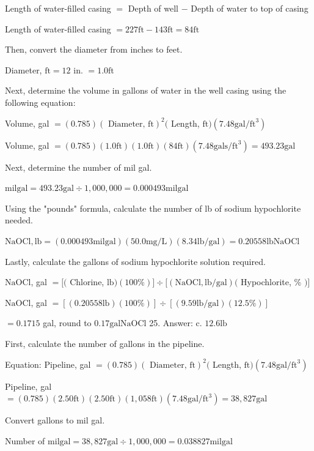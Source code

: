 \documentclass[10pt]{article}
\begin{document}
Length of water-filled casing $=$ Depth of well $-$ Depth of water to top of casing

Length of water-filled casing $=227 \mathrm{ft}-143 \mathrm{ft}=84 \mathrm{ft}$

Then, convert the diameter from inches to feet.

Diameter, $\mathrm{ft}=12$ in. $=1.0 \mathrm{ft}$

Next, determine the volume in gallons of water in the well casing using the following equation:

Volume, gal $=(0.785)(\text { Diameter, } \mathrm{ft})^{2}($ Length, $\mathrm{ft})\left(7.48 \mathrm{gal} / \mathrm{ft}^{3}\right)$

Volume, gal $=(0.785)(1.0 \mathrm{ft})(1.0 \mathrm{ft})(84 \mathrm{ft})\left(7.48 \mathrm{gals} / \mathrm{ft}^{3}\right)=493.23 \mathrm{gal}$

Next, determine the number of mil gal.

$\mathrm{mil} \mathrm{gal}=493.23 \mathrm{gal} \div 1,000,000=0.000493 \mathrm{mil} \mathrm{gal}$

Using the "pounds" formula, calculate the number of lb of sodium hypochlorite needed.

$\mathrm{NaOCl}, \mathrm{lb}=(0.000493 \mathrm{mil} \mathrm{gal})(50.0 \mathrm{mg} / \mathrm{L})(8.34 \mathrm{lb} / \mathrm{gal})=0.20558 \mathrm{lb} \mathrm{NaOCl}$

Lastly, calculate the gallons of sodium hypochlorite solution required.

$\mathrm{NaOCl}$, gal $=[($ Chlorine, $\mathrm{lb})(100 \%)] \div[(\mathrm{NaOCl}, \mathrm{lb} / \mathrm{gal})($ Hypochlorite, \% $)]$

$\mathrm{NaOCl}$, gal $=[(0.20558 \mathrm{lb})(100 \%)] \div[(9.59 \mathrm{lb} / \mathrm{gal})(12.5 \%)]$

$=0.1715$ gal, round to $0.17 \mathrm{gal} \mathrm{NaOCl}$ 25. Answer: c. $12.6 \mathrm{lb}$

First, calculate the number of gallons in the pipeline.

Equation: Pipeline, gal $=(0.785)(\text { Diameter, } \mathrm{ft})^{2}($ Length, $\mathrm{ft})\left(7.48 \mathrm{gal} / \mathrm{ft}^{3}\right)$

Pipeline, gal $=(0.785)(2.50 \mathrm{ft})(2.50 \mathrm{ft})(1,058 \mathrm{ft})\left(7.48 \mathrm{gal} / \mathrm{ft}^{3}\right)=38,827 \mathrm{gal}$

Convert gallons to mil gal.

Number of $\mathrm{mil} \mathrm{gal}=38,827 \mathrm{gal} \div 1,000,000=0.038827 \mathrm{mil} \mathrm{gal}$
\end{document}
